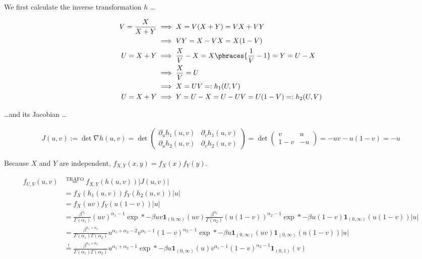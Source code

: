 \begin{solution}

We first calculate the inverse transformation $h$ \dots

\begin{align*}
    V = \frac{X}{X + Y}
    & \implies
    X = V (X + Y) = V X + V Y \\
    & \implies
    V Y = X - V X = X (1 - V ) \\
    U = X + Y
    & \implies
    \frac{X}{V} - X = X \pbraces{\frac{1}{V} - 1} = Y = U - X \\
    & \implies
    \frac{X}{V} = U \\
    & \implies
    X = U V =: h_1(U, V) \\
    U = X + Y
    & \implies
    Y = U - X = U - U V = U (1 - V) =: h_2(U, V)
\end{align*}

\dots and its Jacobian \dots

\begin{align*}
    J(u, v)
    :=
    \det \nabla h(u, v)
    =
    \det
    \begin{pmatrix}
        \partial_u h_1(u, v) & \partial_v h_1(u, v) \\
        \partial_u h_2(u, v) & \partial_v h_2(u, v)
    \end{pmatrix}
    =
    \det
    \begin{pmatrix}
            v &  u \\
        1 - v & -u
    \end{pmatrix}
    =
    -u v - u (1 - v)
    =
    -u
\end{align*}

Because $X$ and $Y$ are independent, $f_{X, Y}(x, y) = f_X(x) f_Y(y)$.

\begin{align*}
    f_{U, V}(u, v)
    & \stackrel
    {
        \text{TRAFO}
    }{=}
    f_{X, Y}(h(u, v)) |J(u, v)| \\
    & =
    f_X(h_1(u, v)) f_Y(h_2(u, v)) |u| \\
    & =
    f_X(u v) f_Y(u (1 - v)) |u| \\
    & =
    \frac{\beta^{\alpha_1}}{\Gamma(\alpha_1)} (u v)      ^{\alpha_1 - 1} \exp*{-\beta u v}       \mathbf 1_{(0, \infty)}(u v)
    \frac{\beta^{\alpha_2}}{\Gamma(\alpha_2)} (u (1 - v))^{\alpha_2 - 1} \exp*{-\beta u (1 - v)} \mathbf 1_{(0, \infty)}(u (1 - v))
    |u| \\
    & =
    \frac{\beta^{\alpha_1 + \alpha_2}}{\Gamma(\alpha_1) \Gamma(\alpha_2)}
    u^{\alpha_1 + \alpha_2 - 2}
    v^{\alpha_1 - 1} (1 - v)^{\alpha_2 - 1}
    \exp*{-\beta u}
    \mathbf 1_{(0, \infty)}(u v)
    \mathbf 1_{(0, \infty)}(u (1 - v))
    |u| \\
    & \stackrel{!}{=}
    \frac{\beta^{\alpha_1 + \alpha_2}}{\Gamma(\alpha_1) \Gamma(\alpha_2)}
    u^{\alpha_1 + \alpha_2 - 1}
    \exp*{-\beta u}
    \mathbf 1_{(0, \infty)}(u)
    v^{\alpha_1 - 1} (1 - v)^{\alpha_2 - 1}
    \mathbf 1_{(0, 1)}(v)
\end{align*}


\end{solution}
